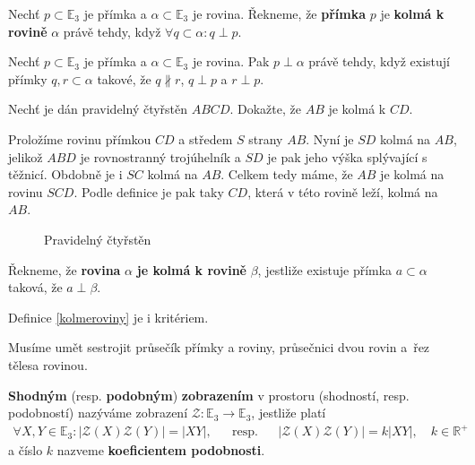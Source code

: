 \begin{definition}
    Nechť $p\subset \mathbb E_3$ je přímka a $\alpha \subset \mathbb E_3$ je rovina.
    Řekneme, že \textbf{přímka} $p$ je \textbf{kolmá k rovině} $\alpha$ právě tehdy,
    když $\forall q \subset \alpha\colon q \perp p.$
\end{definition}

\begin{veta}
    Nechť $p\subset \mathbb E_3$ je přímka a $\alpha \subset \mathbb E_3$ je rovina.
    Pak  $p\perp \alpha$ právě tehdy, když existují přímky $q,r \subset \alpha$ takové, že $ q \nparallel r$, $q\perp p$ a $ r\perp p.$
\end{veta}

\begin{priklad}
Nechť je dán pravidelný čtyřstěn $ABCD$. Dokažte, že $AB$ je kolmá k $CD$.
\end{priklad}

\begin{reseni}
Proložíme rovinu přímkou $CD$ a středem $S$ strany $AB$. Nyní je $SD$ kolmá na $AB$, jelikož
$ABD$ je rovnostranný trojúhelník a $SD$ je pak jeho výška splývající s těžnicí. Obdobně je
i $SC$ kolmá na $AB$. Celkem tedy máme, že $AB$ je kolmá na rovinu $SCD$. Podle definice je pak taky
$CD$, která v této rovině leží, kolmá na $AB$.
\begin{figure}[h]
	\centering
	\caption{Pravidelný čtyřstěn}
\end{figure}
\end{reseni}

\begin{definition}\label{kolmeroviny}
    Řekneme, že \textbf{rovina} $\alpha$ \textbf{je kolmá k rovině} $\beta$, jestliže existuje přímka $a \subset \alpha$ taková, že $a \perp\beta$.
\end{definition}

\begin{pozn}
    Definice \ref{kolmeroviny} je i kritériem.
\end{pozn}

\begin{pozn}
    Musíme umět sestrojit průsečík přímky a roviny, průsečnici dvou rovin a~řez
    tělesa rovinou.
\end{pozn}

\begin{definition}
\textbf{Shodným} (resp. \textbf{podobným}) \textbf{zobrazením} v prostoru (shodností,
resp. podobností) nazýváme zobrazení $\mathscr Z\colon
\mathbb E_3 \to \mathbb E_3$, jestliže platí
\begin{align*}
    \forall X, Y \in \mathbb E_3\colon |\mathscr Z(X)\mathscr Z(Y)| =|XY|, & & \textrm{resp.} & & |\mathscr Z(X)\mathscr Z(Y)|=k|XY|, \quad k \in \mathbb R^+
\end{align*}
a číslo $k$ nazveme \textbf{koeficientem podobnosti}.
\end{definition}

